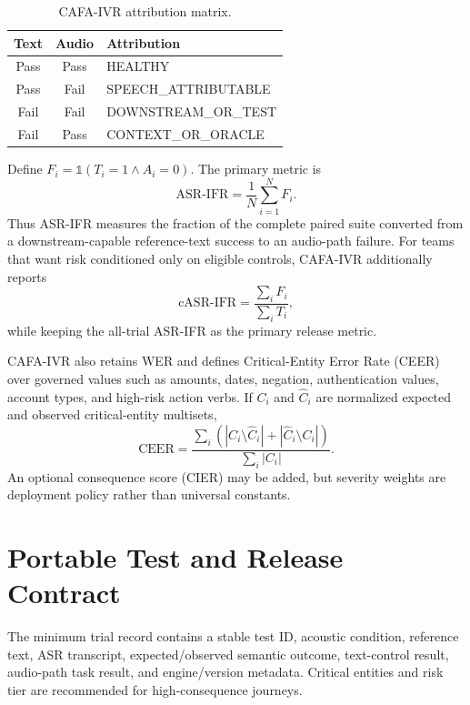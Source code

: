 \documentclass[conference]{IEEEtran}
\begin{document}
\begin{table}[t]
\caption{CAFA-IVR attribution matrix.}
\label{tab:attrib}
\centering\scriptsize
\begin{tabular}{ccl}
\toprule
Text & Audio & Attribution\\
\midrule
Pass & Pass & HEALTHY\\
Pass & Fail & SPEECH\_ATTRIBUTABLE\\
Fail & Fail & DOWNSTREAM\_OR\_TEST\\
Fail & Pass & CONTEXT\_OR\_ORACLE\\
\bottomrule
\end{tabular}
\end{table}

Define $F_i=\mathbb{1}(T_i=1\land A_i=0)$. The primary metric is
\begin{equation}
\mathrm{ASR\mbox{-}IFR}=\frac{1}{N}\sum_{i=1}^{N}F_i.
\end{equation}
Thus ASR-IFR measures the fraction of the complete paired suite converted from a downstream-capable reference-text success to an audio-path failure. For teams that want risk conditioned only on eligible controls, CAFA-IVR additionally reports
\begin{equation}
\mathrm{cASR\mbox{-}IFR}=\frac{\sum_i F_i}{\sum_i T_i},
\end{equation}
while keeping the all-trial ASR-IFR as the primary release metric.

CAFA-IVR also retains WER and defines Critical-Entity Error Rate (CEER) over governed values such as amounts, dates, negation, authentication values, account types, and high-risk action verbs. If $C_i$ and $\hat C_i$ are normalized expected and observed critical-entity multisets,
\begin{equation}
\mathrm{CEER}=\frac{\sum_i (|C_i\setminus\hat C_i|+|\hat C_i\setminus C_i|)}{\sum_i |C_i|}.
\end{equation}
An optional consequence score (CIER) may be added, but severity weights are deployment policy rather than universal constants.

\section{Portable Test and Release Contract}
The minimum trial record contains a stable test ID, acoustic condition, reference text, ASR transcript, expected/observed semantic outcome, text-control result, audio-path task result, and engine/version metadata. Critical entities and risk tier are recommended for high-consequence journeys.
\end{document}
